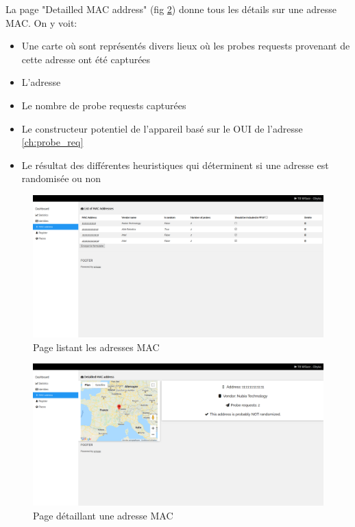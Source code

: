 La page "Detailled MAC address" (fig \ref{fig:dashboard_macs}) donne tous les détails sur une adresse MAC. On y voit:
\begin{itemize}
    \item Une carte où sont représentés divers lieux où les probes requests provenant de cette adresse ont été capturées
    \item L'adresse
    \item Le nombre de probe requests capturées
    \item Le constructeur potentiel de l'appareil basé sur le OUI de l'adresse \ref{ch:probe_req}
    \item Le résultat des différentes heuristiques qui déterminent si une adresse est randomisée ou non
\end{itemize}

\clearpage
\newpage
\thispagestyle{empty}
\begin{landscape}
    \centering
\thispagestyle{empty}
\begin{figure}[H]
	\includegraphics[width=0.95\linewidth]{images/dashboard/macs.png}
	\caption{Page listant les adresses MAC}
	\label{fig:dashboard_list_macs}
\end{figure}
\end{landscape}

\clearpage
\newpage
\thispagestyle{empty}
\begin{landscape}
    \centering
\thispagestyle{empty}
\begin{figure}[H]
	\includegraphics[width=0.95\linewidth]{images/dashboard/detailled_macs.png}
	\caption{Page détaillant une adresse MAC}
	\label{fig:dashboard_macs}
\end{figure}
\end{landscape}

